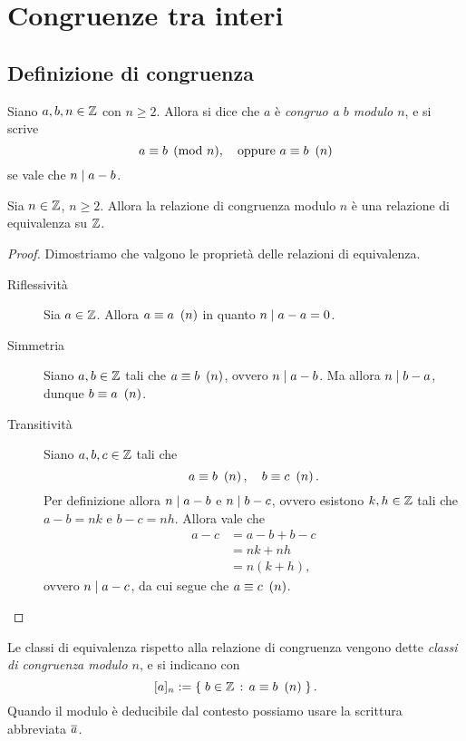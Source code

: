 \chapter{Congruenze tra interi}

\section{Definizione di congruenza}

\begin{definition}
    Siano $a, b, n \in \mathbb{Z}$ con $n \geq 2$. Allora si dice che $a$ è \emph{congruo a $b$ modulo $n$}, e si scrive \[
        a \equiv b \pmod{n},  \quad \text{oppure }  a \equiv b \ \left(n\right)
    \] se vale che $n \mid a - b$. 
\end{definition}

\begin{proposition}
    Sia $n \in \mathbb{Z}$, $n \geq 2$. Allora la relazione di congruenza modulo $n$ è una relazione di equivalenza su $\mathbb{Z}$.
\end{proposition}
\begin{proof}
    Dimostriamo che valgono le proprietà delle relazioni di equivalenza.
    \begin{description}
        \item[Riflessività] Sia $a \in \mathbb{Z}$. Allora $a \equiv a \ \left(n\right)$ in quanto $n \mid a-a = 0$.
        \item[Simmetria] Siano $a, b \in \mathbb{Z}$ tali che $a \equiv b \ \left(n\right)$, ovvero $n \mid a - b$. Ma allora $n \mid b-a$, dunque $b \equiv a \ \left(n\right)$.
        \item[Transitività] Siano $a, b, c \in \mathbb{Z}$ tali che \[
            a \equiv b \ \left(n\right), \quad b \equiv c \ \left(n\right).    
        \] Per definizione allora $n \mid a - b$ e $n \mid b-c$, ovvero esistono $k, h \in \mathbb{Z}$ tali che $a - b = nk$ e $b - c = nh$.
        Allora vale che \begin{align*}
            a - c &= a - b + b - c \\
            &= nk + nh \\
            &= n(k + h),
        \end{align*} ovvero $n \mid a - c$, da cui segue che $a \equiv c \ \left(n\right)$. \qedhere
    \end{description}
\end{proof}

Le classi di equivalenza rispetto alla relazione di congruenza vengono dette \emph{classi di congruenza modulo $n$}, e si indicano con \[
    [a]_n := \left\{\;b \in \mathbb{Z} \,:\, a \equiv b \ \left(n\right)\;\right\}.    
\] Quando il modulo è deducibile dal contesto possiamo usare la scrittura abbreviata $\eqclass a$.

